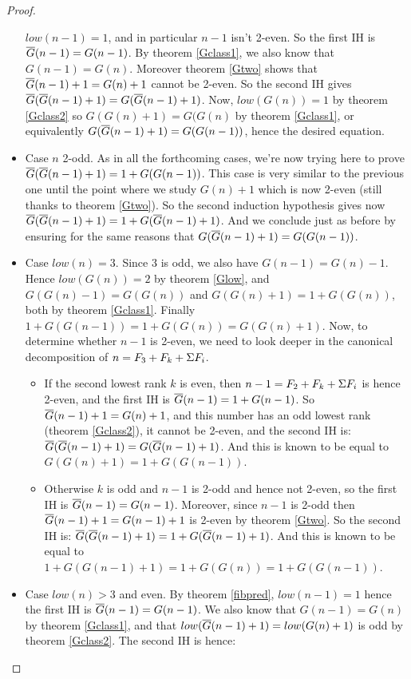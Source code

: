 \documentclass[a4paper,11pt]{article}
\begin{document}
\begin{proof}
\begin{itemize}
  $low(n-1) = 1$, and in particular $n-1$ isn't 2-even.
  So the first IH is $\overline{G}(n-1)=G(n-1)$.
  By theorem \ref{Gclass1}, we also know that $G(n-1)=G(n)$.
  Moreover theorem \ref{Gtwo} shows that $\overline{G}(n-1)+1 = G(n)+1$
  cannot be 2-even.
  So the second IH gives $\overline{G}(\overline{G}(n-1)+1) = G(\overline{G}(n-1)+1)$.
  Now, $low(G(n))=1$ by theorem \ref{Gclass2} so $G(G(n)+1)=G(G(n)$
  by theorem \ref{Gclass1}, or equivalently $G(\overline{G}(n-1)+1)=G(G(n-1))$,
  hence the desired equation.
\item Case $n$ 2-odd. As in all the forthcoming cases, we're now trying here
  to prove $\overline{G}(\overline{G}(n-1)+1)=1+G(G(n-1))$.
  This case is very similar to the previous one until the point
  where we study $G(n)+1$ which is now 2-even (still thanks to theorem
  \ref{Gtwo}).
  So the second induction hypothesis gives now
  $\overline{G}(\overline{G}(n-1)+1) = 1+G(\overline{G}(n-1)+1)$. And we conclude just as before
  by ensuring for the same reasons that $G(\overline{G}(n-1)+1)=G(G(n-1))$.
\item Case $low(n)=3$.
  Since 3 is odd, we also have $G(n-1)=G(n)-1$.
  Hence $low(G(n))=2$ by theorem \ref{Glow}, and $G(G(n)-1)=G(G(n))$
  and $G(G(n)+1)=1+G(G(n))$, both by theorem \ref{Gclass1}.
  Finally $1+G(G(n-1)) = 1+G(G(n)) = G(G(n)+1)$.
  Now, to determine whether $n-1$ is 2-even,
  we need to look deeper in the canonical decomposition of
  $n = F_3+F_k+\Sigma F_i$.
  \begin{itemize}
  \item If the second lowest rank $k$ is even, then
    $n-1 = F_2+F_k+\Sigma F_i$ is hence 2-even, and the first IH is
    $\overline{G}(n-1)=1+G(n-1)$. So
    $\overline{G}(n-1)+1=G(n)+1$, and this number has an odd lowest rank
    (theorem \ref{Gclass2}), it cannot be 2-even, and the second IH
    is:
    $\overline{G}(\overline{G}(n-1)+1)=G(\overline{G}(n-1)+1)$. And this is known to be equal
    to $G(G(n)+1)=1+G(G(n-1))$.
  \item Otherwise $k$ is odd and $n-1$ is 2-odd
    and hence not 2-even, so the first IH is $\overline{G}(n-1)=G(n-1)$.
    Moreover, since $n-1$ is 2-odd then $\overline{G}(n-1)+1=G(n-1)+1$ is 2-even by
    theorem \ref{Gtwo}. So the second IH is:
    $\overline{G}(\overline{G}(n-1)+1)=1+G(\overline{G}(n-1)+1)$. And this is known to be equal
    to $1+G(G(n-1)+1)=1+G(G(n))=1+G(G(n-1))$.
  \end{itemize}
\item Case $low(n)>3$ and even.
  By theorem \ref{fibpred}, $low(n-1)=1$ hence the first IH is
  $\overline{G}(n-1)=G(n-1)$. We also know that $G(n-1)=G(n)$ by theorem
  \ref{Gclass1}, and that $low(\overline{G}(n-1)+1)=low(G(n)+1)$ is odd
  by theorem \ref{Gclass2}. The second IH is hence:

\end{itemize}
\end{proof}
\end{document}
